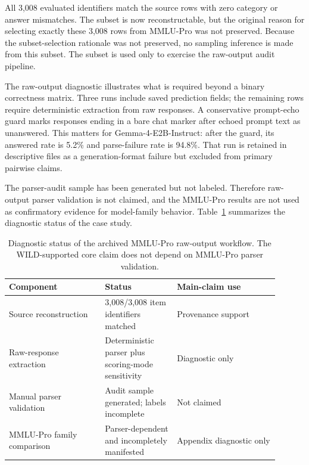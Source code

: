\documentclass[manuscript, screen, review, nonacm]{jair}
\begin{document}
\begin{table}[t]
\centering
\small

\caption{MMLU-Pro source-manifest reconstruction. The public artifact stores row hashes and source identifiers, not benchmark question text or answer-option text.}
\label{tab:mmlu-pro-manifest}
\end{table}

All 3,008 evaluated identifiers match the source rows with zero category or answer mismatches. The subset is now reconstructable, but the original reason for selecting exactly these 3,008 rows from MMLU-Pro was not preserved. Because the subset-selection rationale was not preserved, no sampling inference is made from this subset. The subset is used only to exercise the raw-output audit pipeline.

The raw-output diagnostic illustrates what is required beyond a binary correctness matrix. Three runs include saved prediction fields; the remaining rows require deterministic extraction from raw responses. A conservative prompt-echo guard marks responses ending in a bare chat marker after echoed prompt text as unanswered. This matters for Gemma-4-E2B-Instruct: after the guard, its answered rate is 5.2\% and parse-failure rate is 94.8\%. That run is retained in descriptive files as a generation-format failure but excluded from primary pairwise claims.

The parser-audit sample has been generated but not labeled. Therefore raw-output parser validation is not claimed, and the MMLU-Pro results are not used as confirmatory evidence for model-family behavior. Table~\ref{tab:mmlu-diagnostic-status} summarizes the diagnostic status of the case study.

\begin{table}[t]
\centering
\small
\begin{tabular}{p{0.32\linewidth}p{0.24\linewidth}p{0.34\linewidth}}
\toprule
Component & Status & Main-claim use \\
\midrule
Source reconstruction & 3,008/3,008 item identifiers matched & Provenance support \\
Raw-response extraction & Deterministic parser plus scoring-mode sensitivity & Diagnostic only \\
Manual parser validation & Audit sample generated; labels incomplete & Not claimed \\
MMLU-Pro family comparison & Parser-dependent and incompletely manifested & Appendix diagnostic only \\
\bottomrule
\end{tabular}
\caption{Diagnostic status of the archived MMLU-Pro raw-output workflow. The WILD-supported core claim does not depend on MMLU-Pro parser validation.}
\label{tab:mmlu-diagnostic-status}
\end{table}
\end{document}
